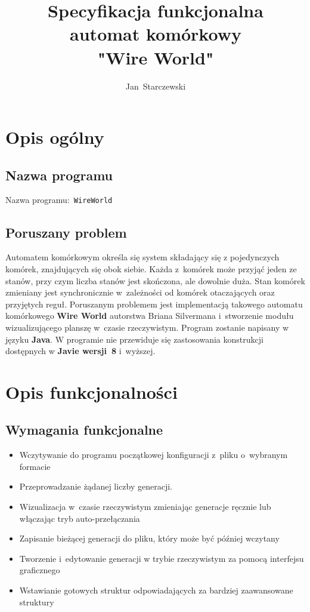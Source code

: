 \documentclass[a4paper,11pt]{article}
\author{Jan~Starczewski}
\title{
	\Huge Specyfikacja funkcjonalna \\
	automat komórkowy\\
	\textbf{"Wire World"}
}
\begin{document}
 
	\maketitle 
	\newpage
	\tableofcontents 
	\newpage
	\section {Opis ogólny}
	\subsection{Nazwa programu} 
	Nazwa programu:~\texttt{WireWorld}
	\subsection{Poruszany problem}
	Automatem komórkowym określa się system składający się z pojedynczych komórek, znajdujących się obok siebie. Każda z~komórek może przyjąć jeden ze stanów, przy czym liczba stanów jest skończona, ale dowolnie duża. Stan komórek zmieniany jest synchronicznie w~zależności od komórek otaczających oraz przyjętych reguł. Poruszanym problemem jest implementacją takowego automatu komórkowego \textbf{Wire World} autorstwa Briana Silvermana i~stworzenie modułu wizualizującego planszę w~czasie rzeczywistym. Program zostanie napisany w języku \textbf{Java}. W programie nie przewiduje się zastosowania konstrukcji dostępnych w \textbf{Javie wersji~8} i~wyższej. 
	\newpage
	\section{Opis funkcjonalności}
		\subsection{Wymagania funkcjonalne}
		\begin{itemize}
		\item Wczytywanie do programu początkowej konfiguracji z~pliku o~wybranym formacie
		\item Przeprowadzanie żądanej liczby generacji.
		\item Wizualizacja w~czasie rzeczywistym zmieniając generacje ręcznie lub włączając tryb auto-przełączania
		\item Zapisanie bieżącej generacji do pliku, który może być później wczytany
		\item Tworzenie i~edytowanie generacji w trybie rzeczywistym za pomocą interfejsu graficznego
		\item Wstawianie gotowych struktur odpowiadających za bardziej zaawansowane struktury
	  \end{itemize}
\end{document}
